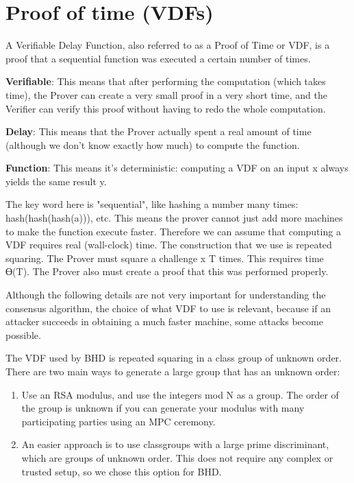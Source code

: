 \section{Proof of time (VDFs)}
\begin{flushleft}
    A Verifiable Delay Function, also referred to as a Proof of Time or VDF, is a proof that a sequential function was executed a certain number of times.
\end{flushleft}
\begin{flushleft}
    \textbf{Verifiable}: This means that after performing the computation (which takes time), the Prover can create a very small proof in a very short time, and the Verifier can verify this proof without having to redo the whole computation.
\end{flushleft}
\begin{flushleft}
    \textbf{Delay}: This means that the Prover actually spent a real amount of time (although we don’t know exactly how much) to compute the function.
\end{flushleft}
\begin{flushleft}
    \textbf{Function}: This means it’s deterministic: computing a VDF on an input x always yields the same result y.
\end{flushleft}
\begin{flushleft}
    The key word here is "sequential", like hashing a number many times: hash(hash(hash(a))), etc. This means the prover cannot just add more machines to make the function execute faster. Therefore we can assume that computing a VDF requires real (wall-clock) time. The construction that we use is repeated squaring. The Prover must square a challenge x T times. This requires time ϴ(T). The Prover also must create a proof that this was performed properly.
\end{flushleft}
\begin{flushleft}
    Although the following details are not very important for understanding the consensus algorithm, the choice of what VDF to use is relevant, because if an attacker succeeds in obtaining a much faster machine, some attacks become possible.
\end{flushleft}

\begin{flushleft}
    The VDF used by BHD is repeated squaring in a class group of unknown order. There are two main ways to generate a large group that has an unknown order:
\end{flushleft}
\begin{enumerate}
    \item Use an RSA modulus, and use the integers mod N as a group. The order of the group is unknown if you can generate your modulus with many participating parties using an MPC ceremony.
    \item An easier approach is to use classgroups with a large prime discriminant, which are groups of unknown order. This does not require any complex or trusted setup, so we chose this option for BHD.
\end{enumerate}
